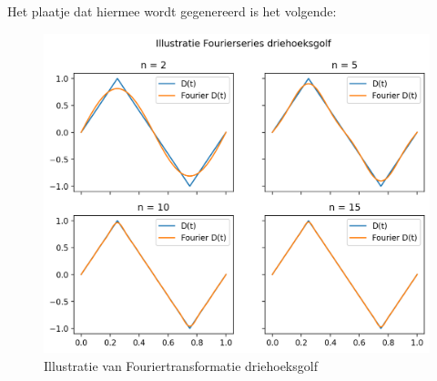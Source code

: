 \documentclass[12pt, dutch, a4paper]{article}
\theoremstyle{definition}
\begin{document}
\begin{enumerate}[(a)., wide]
  Het plaatje dat hiermee wordt gegenereerd is het volgende:
  \begin{figure}[h] \label{driehoekfiguur}
    \includegraphics[width=\textwidth]{images/Fourier_driehoekgolf.png}
    \caption{Illustratie van Fouriertransformatie driehoeksgolf}  
  \end{figure}


\end{enumerate}
\end{document}
